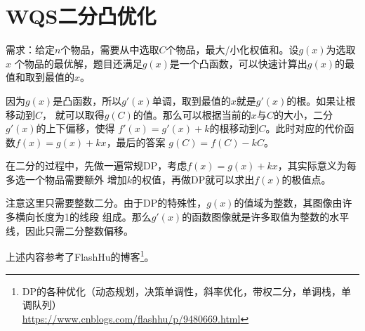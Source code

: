 \section{WQS二分凸优化}
需求：给定$n$个物品，需要从中选取$C$个物品，最大/小化权值和。设$g(x)$为选取$x$
个物品的最优解，题目还满足$g(x)$是一个凸函数，可以快速计算出$g(x)$的最值和取到最值的$x$。

因为$g(x)$是凸函数，所以$g'(x)$单调，取到最值的$x$就是$g'(x)$的根。如果让根移动到$C$，
就可以取得$g(C)$的值。那么可以根据当前的$x$与$C$的大小，二分$g'(x)$的上下偏移，使得
$f'(x)=g'(x)+k$的根移动到$C$。此时对应的代价函数$f(x)=g(x)+kx$，最后的答案
$g(C)=f(C)-kC$。

在二分的过程中，先做一遍常规DP，考虑$f(x)=g(x)+kx$，其实际意义为每多选一个物品需要额外
增加$k$的权值，再做DP就可以求出$f(x)$的极值点。

注意这里只需要整数二分。由于DP的特殊性，$g(x)$的值域为整数，其图像由许多横向长度为1的线段
组成。那么$g'(x)$的函数图像就是许多取值为整数的水平线，因此只需二分整数偏移。

上述内容参考了FlashHu的博客\footnote{
    DP的各种优化（动态规划，决策单调性，斜率优化，带权二分，单调栈，单调队列）\\
    \url{https://www.cnblogs.com/flashhu/p/9480669.html}
}。
